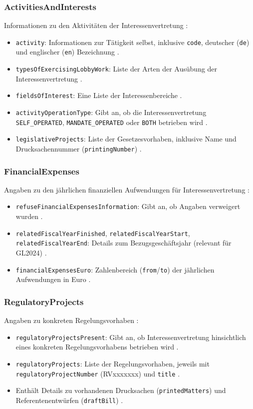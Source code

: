 \documentclass[12pt,twoside=false,a4paper,parskip]{scrbook}
\begin{document}
\subsubsection{ActivitiesAndInterests}
Informationen zu den Aktivitäten der Interessenvertretung :
\begin{itemize}
    \item \texttt{activity}: Informationen zur Tätigkeit selbst, inklusive \texttt{code}, deutscher (\texttt{de}) und englischer (\texttt{en}) Bezeichnung .
    \item \texttt{typesOfExercisingLobbyWork}: Liste der Arten der Ausübung der Interessenvertretung .
    \item \texttt{fieldsOfInterest}: Eine Liste der Interessenbereiche .
    \item \texttt{activityOperationType}: Gibt an, ob die Interessenvertretung \texttt{SELF\_OPERATED}, \texttt{MANDATE\_OPERATED} oder \texttt{BOTH} betrieben wird .
    \item \texttt{legislativeProjects}: Liste der Gesetzesvorhaben, inklusive Name und Drucksachennummer (\texttt{printingNumber}) .
\end{itemize}

\subsubsection{FinancialExpenses}
Angaben zu den jährlichen finanziellen Aufwendungen für Interessenvertretung :
\begin{itemize}
    \item \texttt{refuseFinancialExpensesInformation}: Gibt an, ob Angaben verweigert wurden .
    \item \texttt{relatedFiscalYearFinished}, \texttt{relatedFiscalYearStart}, \texttt{relatedFiscalYearEnd}: Details zum Bezugsgeschäftsjahr (relevant für GL2024) .
    \item \texttt{financialExpensesEuro}: Zahlenbereich (\texttt{from}/\texttt{to}) der jährlichen Aufwendungen in Euro .
\end{itemize}

\subsubsection{RegulatoryProjects}
Angaben zu konkreten Regelungsvorhaben :
\begin{itemize}
    \item \texttt{regulatoryProjectsPresent}: Gibt an, ob Interessenvertretung hinsichtlich eines konkreten Regelungsvorhabens betrieben wird .
    \item \texttt{regulatoryProjects}: Liste der Regelungsvorhaben, jeweils mit \texttt{regulatoryProjectNumber} (RVxxxxxxx) und \texttt{title} .
    \item Enthält Details zu vorhandenen Drucksachen (\texttt{printedMatters})  und Referentenentwürfen (\texttt{draftBill}) .
\end{itemize}
\end{document}
